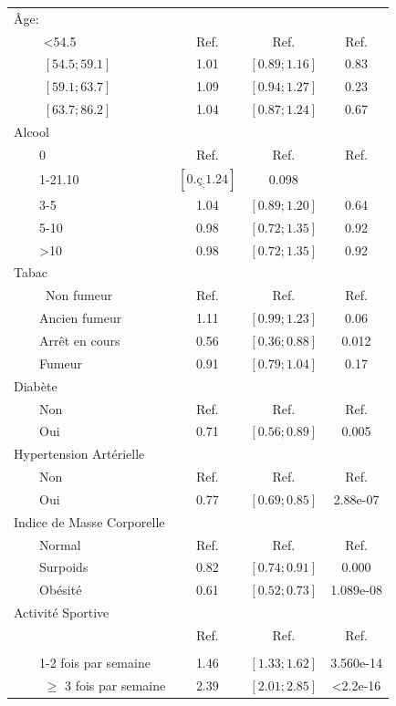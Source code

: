 \documentclass{book}
\begin{document}
\begin{longtable}{lccc}
Âge: &&&\\
$\qquad$ <54.5 &Ref.&Ref.&Ref.\\
$\qquad$ $\left[54.5 ; 59.1 \right]$ &1.01& $\left[0.89 ; 1.16 \right]$& 0.83\\
$\qquad$ $\left[59.1 ; 63.7\right]$ &1.09&$\left[0.94 ; 1.27 \right]$& 0.23\\
$\qquad$ $\left[63.7 ; 86.2 \right]$&1.04&$\left[0.87 ; 1.24 \right]$&0.67\\
Alcool&&&\\
$\qquad$0 & Ref. & Ref. & Ref.\\
$\qquad$1-21.10 & $\left[0.ç_ ; 1.24 \right]$ & 0.098\\
$\qquad$3-5 & 1.04 & $\left[0.89 ; 1.20 \right]$ & 0.64\\
$\qquad$5-10 & 0.98 & $\left[0.72 ; 1.35 \right]$ &0.92\\
$\qquad$>10 & 0.98 & $\left[0.72 ; 1.35 \right]$ & 0.92\\
Tabac&&&\\\
$\qquad$Non fumeur& Ref.& Ref.&Ref.\\
$\qquad$Ancien fumeur&1.11&$\left[0.99 ; 1.23 \right]$ &0.06\\
$\qquad$Arrêt en cours& 0.56 & $\left[0.36 ; 0.88 \right]$&0.012\\
$\qquad$Fumeur&0.91 & $\left[0.79 ; 1.04 \right]$& 0.17\\
Diabète&&&\\
$\qquad$Non &Ref.&Ref.&Ref.\\
$\qquad$Oui & 0.71 & $\left[0.56 ; 0.89 \right]$ & 0.005\\
Hypertension Artérielle&&&\\
$\qquad$Non &Ref.&Ref.&Ref.\\
$\qquad$Oui&0.77& $\left[0.69 ; 0.85 \right]$&2.88e-07\\
Indice de Masse Corporelle &&&\\
$\qquad$Normal&Ref.&Ref.&Ref.\\
$\qquad$Surpoids&0.82&$\left[0.74 ; 0.91 \right]$ &0.000\\
$\qquad$Obésité&0.61&$\left[0.52 ; 0.73 \right]$&1.089e-08\\
Activité Sportive&&&\\
$\qquad$&Ref.&Ref.&Ref.\\\\
$\qquad$1-2 fois par semaine&1.46& $\left[1.33 ; 1.62 \right]$& 3.560e-14\\
$\qquad$ $\geq$ 3 fois par semaine&2.39& $\left[2.01 ; 2.85 \right]$ & <2.2e-16\\

\end{longtable}
\end{document}
